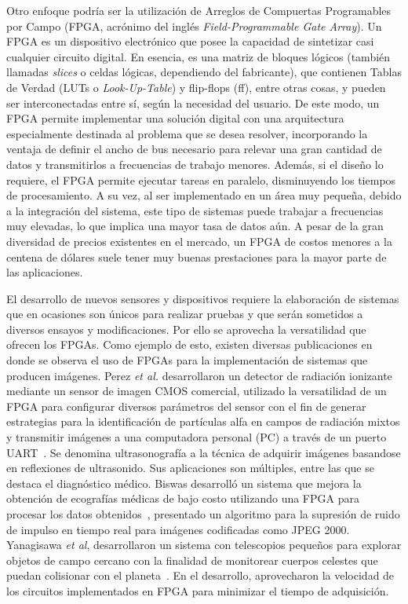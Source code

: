 Otro enfoque podría ser la utilización de Arreglos de Compuertas Programables por Campo (FPGA, acrónimo del inglés {\it Field-Programmable Gate Array}). Un FPGA es un dispositivo electrónico que posee la capacidad de sintetizar casi cualquier circuito digital. En esencia, es una matriz de bloques lógicos (también llamadas {\it slices} o celdas lógicas, dependiendo del fabricante), que contienen Tablas de Verdad (LUTs o {\it Look-Up-Table}) y flip-flops (ff), entre otras cosas, y pueden ser interconectadas entre sí, según la necesidad del usuario. De este modo, un FPGA permite implementar una solución digital con una arquitectura especialmente destinada al problema que se desea resolver, incorporando la ventaja de definir el ancho de bus necesario para relevar una gran cantidad de datos y transmitirlos a frecuencias de trabajo menores. Además, si el diseño lo requiere, el FPGA permite ejecutar tareas en paralelo, disminuyendo los tiempos de procesamiento. A su vez, al ser implementado en un área muy pequeña, debido a la integración del sistema, este tipo de sistemas puede trabajar a frecuencias muy elevadas, lo que implica una mayor tasa de datos aún. A pesar de la gran diversidad de precios existentes en el mercado, un FPGA de costos menores a la centena de dólares suele tener muy buenas prestaciones para la mayor parte de las aplicaciones.%

El desarrollo de nuevos sensores y dispositivos requiere la elaboración de sistemas que en ocasiones son únicos para realizar pruebas y que serán sometidos a diversos ensayos y modificaciones. Por ello se aprovecha la versatilidad que ofrecen los FPGAs. Como ejemplo de esto, existen diversas publicaciones en donde se observa el uso de FPGAs para la implementación de sistemas que producen imágenes. Perez \textit{et al.} desarrollaron un detector de radiación ionizante mediante un sensor de imagen CMOS comercial, utilizado la versatilidad de un FPGA para configurar diversos parámetros del sensor con el fin de generar estrategias para la identificación de partículas alfa en campos de radiación mixtos y transmitir imágenes a una computadora personal (PC) a través de un puerto UART~\cite{Perez2017}. Se denomina ultrasonografía a la técnica de adquirir imágenes basandose en reflexiones de ultrasonido. Sus aplicaciones son múltiples, entre las que se destaca el diagnóstico médico. Biswas desarrolló un sistema que mejora la obtención de ecografías médicas de bajo costo utilizando una FPGA para procesar los datos obtenidos~\cite{biswas2018embedded}, presentado un algoritmo para la supresión de ruido de impulso en tiempo real para imágenes codificadas como JPEG 2000. Yanagisawa {\it et al}, desarrollaron un sistema con telescopios pequeños para explorar objetos de campo cercano con la finalidad de monitorear cuerpos celestes que puedan colisionar con el planeta~\cite{Yanagisawa2018}. En el desarrollo, aprovecharon la velocidad de los circuitos implementados en FPGA para minimizar el tiempo de adquisición.%

